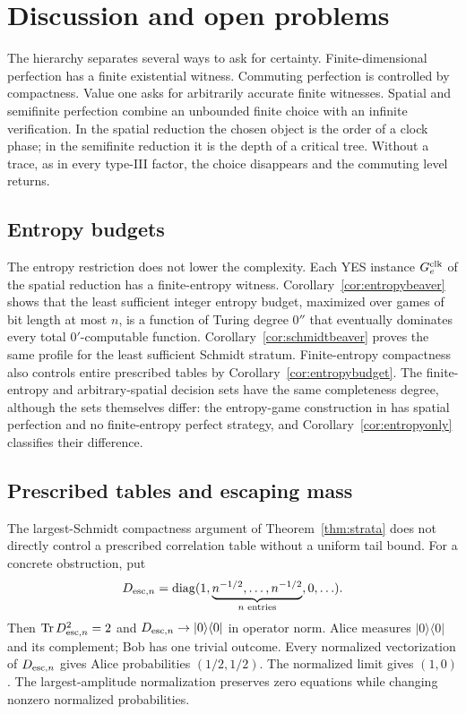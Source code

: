 \section{Discussion and open problems}\label{sec:discussion}
The hierarchy separates several ways to ask for certainty. Finite-dimensional perfection has a finite existential witness. Commuting perfection is controlled by compactness. Value one asks for arbitrarily accurate finite witnesses. Spatial and semifinite perfection combine an unbounded finite choice with an infinite verification. In the spatial reduction the chosen object is the order of a clock phase; in the semifinite reduction it is the depth of a critical tree. Without a trace, as in every type-III factor, the choice disappears and the commuting level returns.

\subsection{Entropy budgets}
The entropy restriction does not lower the complexity. Each YES instance
$G^{\rm clk}_e$ of the spatial reduction has a finite-entropy witness.
Corollary~\ref{cor:entropybeaver} shows that the least sufficient integer entropy budget, maximized over games of bit length at most $n$, is a function of Turing degree $0''$ that eventually dominates every total $0'$-computable function. Corollary~\ref{cor:schmidtbeaver} proves the same profile for the least sufficient Schmidt stratum. Finite-entropy
compactness also controls entire prescribed tables by
Corollary~\ref{cor:entropybudget}. The finite-entropy and arbitrary-spatial
decision sets have the same completeness degree, although the sets
themselves differ: the entropy-game construction in \cite{Entropy} has
spatial perfection and no finite-entropy perfect strategy, and
Corollary~\ref{cor:entropyonly} classifies their difference.

\subsection{Prescribed tables and escaping mass}
The largest-Schmidt compactness argument of Theorem~\ref{thm:strata} does not directly control a prescribed correlation table without a uniform tail bound. For a concrete obstruction, put
\[
 D_{{\rm esc},n}=\operatorname{diag}(1,\underbrace{n^{-1/2},\ldots,n^{-1/2}}_{n\text{ entries}},0,\ldots).
\]
Then $\operatorname{Tr} D_{{\rm esc},n}^2=2$ and $D_{{\rm esc},n}\to|0\rangle\langle0|$ in operator norm. Alice measures $|0\rangle\langle0|$ and its complement; Bob has one trivial outcome. Every normalized vectorization of $D_{{\rm esc},n}$ gives Alice probabilities $(1/2,1/2)$. The normalized limit gives $(1,0)$. The largest-amplitude normalization preserves zero equations while changing nonzero normalized probabilities.

